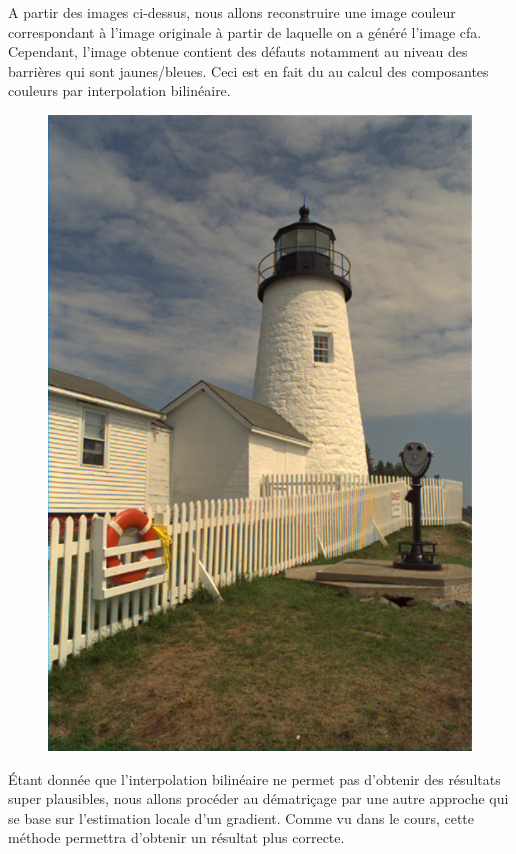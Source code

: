 \documentclass[a4paper,12pt]{report}
\begin{document}
\newpage

A partir des images ci-dessus, nous allons reconstruire une image couleur correspondant à l'image originale à partir de laquelle on a généré l'image cfa. Cependant, l'image obtenue contient des défauts notamment au niveau des barrières qui sont jaunes/bleues. Ceci est en fait du au calcul des composantes couleurs par interpolation bilinéaire.

\begin{figure}[!ht]
	\center
	\includegraphics[scale=0.3]{./image/part2-4.png}
\end{figure}

Étant donnée que l'interpolation bilinéaire ne permet pas d'obtenir des résultats super plausibles, nous allons procéder au dématriçage par une autre approche qui se base sur l'estimation locale d'un gradient. Comme vu dans le cours, cette méthode permettra d'obtenir un résultat plus correcte.
\end{document}
